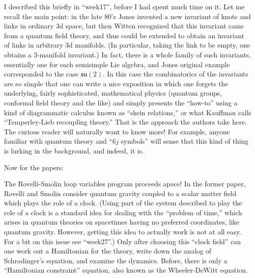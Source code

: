 \documentclass{article}
\renewcommand{\texttt}[1]{%
  \begingroup
  \ttfamily
  \begingroup\lccode`~=`/\lowercase{\endgroup\def~}{/\discretionary{}{}{}}%
  \begingroup\lccode`~=`[\lowercase{\endgroup\def~}{[\discretionary{}{}{}}%
  \begingroup\lccode`~=`.\lowercase{\endgroup\def~}{.\discretionary{}{}{}}%
  \catcode`/=\active\catcode`[=\active\catcode`.=\active
  \scantokens{#1\noexpand}%
  \endgroup
}
\begin{document}
I described this briefly in ``week17'', before I had spent much time on
it. Let me recall the main point: in the late 80's Jones invented a new
invariant of knots and links in ordinary 3d space, but then Witten
recognized that this invariant came from a quantum field theory, and
thus could be extended to obtain an invariant of links in arbitrary 3d
manifolds. (In particular, taking the link to be empty, one obtains a
3-manifold invariant.) In fact, there is a whole family of such
invariants, essentially one for each semisimple Lie algebra, and Jones
original example corresponded to the case \(\mathfrak{su}(2)\). In this
case the combinatorics of the invariants are so simple that one can
write a nice exposition in which one forgets the underlying, fairly
sophisticated, mathematical physics (quantum groups, conformal field
theory and the like) and simply presents the ``how-to'' using a kind of
diagrammatic calculus known as ``skein relations,'' or what Kauffman
calls ``Temperley-Lieb recoupling theory.'' That is the approach the
authors take here. The curious reader will naturally want to know more!
For example, anyone familiar with quantum theory and ``\(6j\) symbols''
will sense that this kind of thing is lurking in the background, and
indeed, it is.

Now for the papers:


The Rovelli-Smolin loop variables program proceeds apace! In the former
paper, Rovelli and Smolin consider quantum gravity coupled to a scalar
matter field which plays the role of a clock. (Using part of the system
described to play the role of a clock is a standard idea for dealing
with the ``problem of time,'' which arises in quantum theories on
spacetimes having no preferred coordinates, like quantum gravity.
However, getting this idea to actually work is not at all easy. For a
bit on this issue see ``week27''.) Only after choosing this ``clock
field'' can one work out a Hamiltonian for the theory, write down the
analog of Schrodinger's equation, and examine the dynamics. Before,
there is only a ``Hamiltonian constraint'' equation, also known as the
Wheeler-DeWitt equation.
\end{document}

